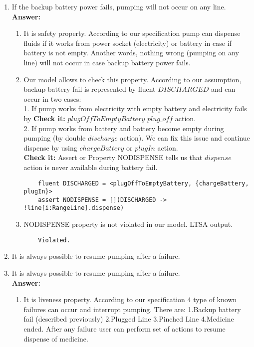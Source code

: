 \documentclass{article}
\begin{document}
\begin{enumerate}
    \item If the backup battery power fails, pumping will not occur on any line.\\
    \textbf{Answer:}
    \begin{enumerate}
    \item It is safety property. According to our specification pump can dispense fluids if it works from power
    socket (electricity) or battery in case if battery is not empty. Another words, nothing wrong (pumping on any line) will
    not occur in case backup battery power fails.
 
    \item Our model allows to check this property. According to our assumption, backup battery fail is represented by fluent
    $DISCHARGED$ and can occur in two cases:\\
    1. If pump works from electricity with empty battery and electricity fails by \textbf{Check it:} $plugOffToEmptyBattery$
    $plug\_off$ action.\\
    2. If pump works from battery and battery become empty during pumping (by double $discharge$ action).
    We can fix this issue and continue dispense by using $chargeBattery$ or $plugIn$ action.\\
    \textbf{Check it:} Assert or Property NODISPENSE tells us that $dispense$ action is never available during battery fail.
    \begin{verbatim}
    fluent DISCHARGED = <plugOffToEmptyBattery, {chargeBattery, plugIn}>
    assert NODISPENSE = [](DISCHARGED -> !line[i:RangeLine].dispense)
    \end{verbatim}
    
    \item NODISPENSE property is not violated in our model. LTSA output.
    \begin{verbatim}
    Violated.
    \end{verbatim} 
    \end{enumerate}    
    
    
    \item It is always possible to resume pumping after a failure.
        \item It is always possible to resume pumping after a failure.\\
    \textbf{Answer:}
    \begin{enumerate}
    \item It is liveness property. According to our specification 4 type of known failures can occur and interrupt
    pumping.
    There are: 1.Backup battery fail (described previously) 2.Plugged Line 3.Pinched Line 4.Medicine ended. After any
    failure user can perform set of actions to resume dispense of medicine.
 

\end{enumerate}
\end{enumerate}
\end{document}
